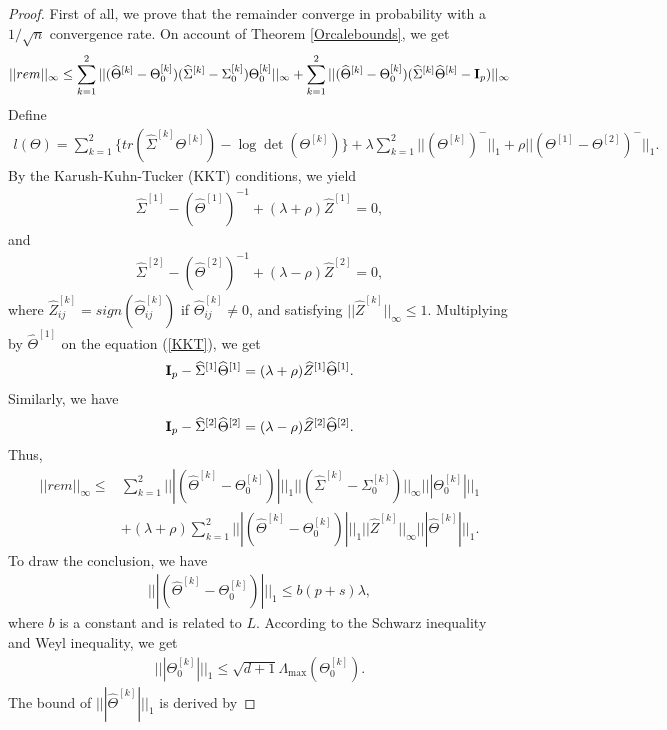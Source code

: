 \documentclass[review]{elsarticle}
\newcommand{\bbI}{{\bf I}}
\newcommand{\1}{{\bf 1}}
\newcommand{\0}{{\bf 0}}
\newcommand{\bqa}{\begin{eqnarray}}
\newcommand{\eqa}{\end{eqnarray}}
\newtheorem{proof}{Proof}
\begin{document}
\begin{appendices}
\begin{proof}
 First of all, we prove that the remainder converge in probability with a $1/\sqrt{n}$ convergence rate.
 On account of Theorem \ref{Orcalebounds}, we get
\begin{equation}
\begin{split}
||rem||_{\infty}\leq \sum_{k=1}^{2} ||(\widehat{\Theta}^{[k]}-\Theta_0^{[k]})
 (\widehat{\Sigma}^{[k]}-\Sigma_0^{[k]})\Theta_0^{[k]}||_{\infty}
 +\sum_{k=1}^{2} || (\widehat{\Theta}^{[k]}-\Theta_0^{[k]})
 (\widehat{\Sigma}^{[k]}\widehat{\Theta}^{[k]}-\bbI_p) ||_{\infty}
\end{split}
\end{equation}
 Define
\bqa
l(\Theta)=\sum_{k=1}^{2} \{tr(\widehat\Sigma^{[k]}\Theta^{[k]})-\log \det(\Theta^{[k]})\}+
\lambda\sum_{k=1}^{2}||(\Theta^{[k]})^{-}||_{1}
+\rho||(\Theta^{[1]}
-\Theta^{[2]})^{-}||_1.
\eqa
 By the Karush-Kuhn-Tucker (KKT) conditions, we yield
\bqa\label{KKT}
\widehat\Sigma^{[1]}-(\widehat{\Theta}^{[1]})^{-1}+(\lambda+\rho)\widehat{Z}^{[1]}=0,
\eqa
 and
\bqa
\widehat\Sigma^{[2]}-(\widehat{\Theta}^{[2]})^{-1}+(\lambda-\rho)\widehat{Z}^{[2]}=0,
\eqa
 where $\widehat{Z}^{[k]}_{ij}=sign(\widehat{\Theta}^{[k]}_{ij})$ if $\widehat{\Theta}^{[k]}_{ij}\neq 0$, and satisfying $||  \widehat{Z}^{[k]} ||_{\infty}\leq 1$.
 Multiplying by $\widehat{\Theta}^{[1]}$ on the equation (\ref{KKT}), we get
\bqa
\bbI_p-\widehat\Sigma^{[1]}\widehat{\Theta}^{[1]}
=(\lambda+\rho)\widehat{Z}^{[1]}\widehat{\Theta}^{[1]}.
\eqa
 Similarly, we have
\bqa
\bbI_p-\widehat\Sigma^{[2]}\widehat{\Theta}^{[2]}
=(\lambda-\rho)\widehat{Z}^{[2]}\widehat{\Theta}^{[2]}.
\eqa
 Thus,
\begin{equation}
\begin{split}
||rem||_{\infty}\leq& \sum_{k=1}^{2} |||  (\widehat{\Theta}^{[k]}-\Theta_0^{[k]})  |||_1
|| (\widehat{\Sigma}^{[k]}-\Sigma_0^{[k]})  ||_{\infty}
|||  \Theta_0^{[k]} |||_1 \\
&+(\lambda+\rho)\sum_{k=1}^{2} |||  (\widehat{\Theta}^{[k]}-\Theta_0^{[k]}) |||_1
||  \widehat{Z}^{[k]} ||_{\infty}
|||   \widehat{\Theta}^{[k]}  |||_1.
\end{split}
\end{equation}
 To draw the conclusion, we have
\bqa\label{colsumnormb}
|||  (\widehat{\Theta}^{[k]}-\Theta_0^{[k]})  |||_1 \leq b(p+s)\lambda,
\eqa
 where $b$ is a constant and is related to $L$.
 According to the Schwarz inequality and Weyl inequality, we get
\bqa
|||  \Theta_0^{[k]} |||_1\leq \sqrt{d+1}\Lambda_{\max}(\Theta_0^{[k]}).
\eqa
 The bound of $|||   \widehat{\Theta}^{[k]}  |||_1$ is derived by

\end{proof}
\end{appendices}
\end{document}
